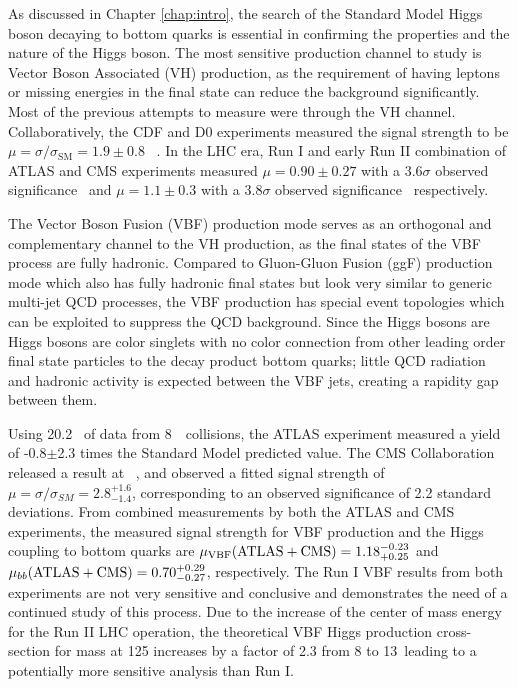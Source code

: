 As discussed in Chapter \ref{chap:intro}, the search of the Standard Model Higgs boson decaying to bottom quarks is essential in confirming the properties and the nature of the Higgs boson. The most sensitive production channel to study \Hbb is Vector Boson Associated (VH) production, as the requirement of having leptons or missing energies in the final state can reduce the background significantly. Most of the previous attempts to measure \Hbb were through the VH channel. Collaboratively, the CDF and D0 experiments measured the \Hbb signal strength to be $\mu=\sigma/\sigma_\text{SM}=1.9 \pm 0.8$ ~\cite{Aaltonen:2012qt}. In the LHC era, Run I and early Run II combination of ATLAS and CMS experiments measured $\mu=0.90 \pm 0.27$ with a $3.6\sigma$ observed significance~\cite{HIGG-2016-29} and $\mu=1.1 \pm 0.3$ with a $3.8\sigma$ observed significance~\cite{CMS-HIG-16-044} respectively.

The Vector Boson Fusion (VBF) production mode serves as an orthogonal and complementary channel to the VH production, as the final states of the VBF \Hbb process are fully hadronic. Compared to Gluon-Gluon Fusion (ggF) production mode which also has fully hadronic final states but look very similar to generic multi-jet QCD processes, the VBF production has special event topologies which can be exploited to suppress the QCD background. Since the Higgs bosons are Higgs bosons are color singlets with no color connection from other leading order final state particles to the decay product bottom quarks; little QCD radiation and hadronic activity is expected between the VBF jets, creating a rapidity gap between them. 

Using 20.2 \ifb~of data from 8~\tev~collisions, the ATLAS experiment measured a yield of -0.8$\pm$2.3 times the Standard Model predicted value\cite{HIGG-2014-12}. The CMS Collaboration released a result\cite{CMS-HIG-14-004} at ~\tev, and observed a fitted signal strength of $\mu = \sigma/\sigma_{SM} = 2.8^{+1.6}_{-1.4}$, corresponding to an observed significance of 2.2 standard deviations.   From combined measurements by both the ATLAS and CMS experiments\cite{HIGG-2015-07}, the measured signal strength for VBF production and the Higgs coupling to bottom quarks are $\mu_{\rm VBF}({\rm ATLAS+CMS})  = 1.18_{+0.25}^{-0.23}$ and $\mu_{bb} ({\rm ATLAS+CMS}) = 0.70^{+0.29}_{-0.27}$, respectively. The Run I VBF \Hbb results from both experiments are not very sensitive and conclusive and demonstrates the need of a continued study of this process. Due to the increase of the center of mass energy for the Run II LHC operation, the theoretical VBF Higgs production cross-section for mass at 125 \GeV increases by a factor of 2.3 from 8 to 13~\tev leading to a potentially more sensitive analysis than Run I. 

